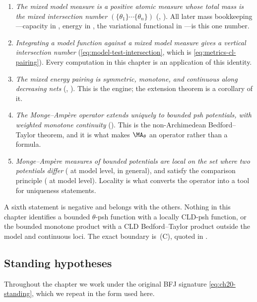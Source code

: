 \begin{enumerate}
\item \emph{The mixed model measure is a positive atomic measure whose total
 mass is the mixed intersection number $(\{\theta_1\}\cdots\{\theta_n\})$}
 (, ).  All later mass
 bookkeeping---capacity in , energy in
 , the variational functional in
 ---is this one number.
\item \emph{Integrating a model function against a mixed model measure gives
 a vertical intersection number} (\eqref{eq:model-test-intersection}, which
 is \eqref{eq:metrics-cl-pairing}).  Every computation in this chapter is
 an application of this identity.
\item \emph{The mixed energy pairing is symmetric, monotone, and continuous
 along decreasing nets} (,
 ).  This is the engine; the extension
 theorem is a corollary of it.
\item \emph{The Monge--Amp\`ere operator extends uniquely to bounded psh
 potentials, with weighted monotone continuity}
 ().  This is the non-Archimedean
 Bedford--Taylor theorem, and it is what makes $\MA_\theta$ an operator
 rather than a formula.
\item \emph{Monge--Amp\`ere measures of bounded potentials are local on the
 set where two potentials differ} ( at
 model level,  in general), and satisfy
 the comparison principle ( at model
 level).  Locality is what converts the operator into a tool for uniqueness
 statements.
\end{enumerate}

A sixth statement is negative and belongs with the others.  Nothing in this
chapter identifies a bounded $\theta$-psh function with a locally CLD-psh
function, or the bounded monotone product with a CLD Bedford--Taylor product
outside the model and continuous loci.  The exact boundary is
\,(C), quoted in
.

\subsection{Standing hypotheses}
\label{sec:ch24-hypotheses}

Throughout the chapter we work under the original BFJ signature
\eqref{eq:ch20-standing}, which we repeat in the form used here.

